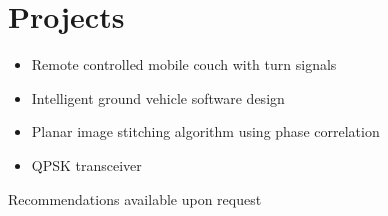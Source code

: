 \documentclass[letterpaper,12pt]{resume}
\begin{document}
\section{Projects}
\begin{itemize} 
  \item
    Remote controlled mobile couch with turn signals
  \item
    Intelligent ground vehicle software design
  \item
    Planar image stitching algorithm using phase correlation
  \item
    QPSK transceiver
\end{itemize}

\par
\begin{center}
  Recommendations available upon request
\end{center}
\end{document}
